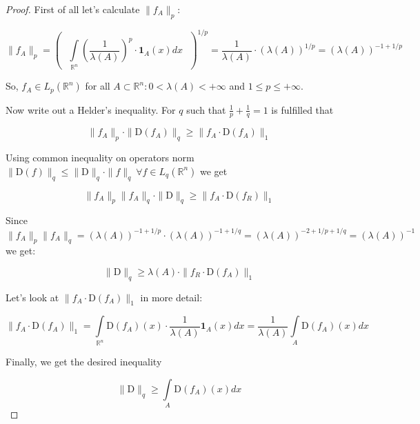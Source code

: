 \documentclass{article}
\begin{document}
    \begin{proof}
        First of all let's calculate $\|f_A\|_p$:

        \begin{equation*}
            \|f_A\|_p = \left( \text{ } \int\limits_{\mathbb{R}^n}\left(\dfrac{1}{\lambda(A)}\right)^p \cdot \textbf{1}_{A}(x) dx \text{ } \right)^{1/p} = \dfrac{1}{\lambda(A)} \cdot (\lambda(A))^{1/p} = (\lambda(A))^{-1 + 1/p}
        \end{equation*}

        So, $f_A \in L_p(\mathbb{R}^n)$ for all $A \subset \mathbb{R}^n : 0 < \lambda(A) < +\infty$ and $1 \leq p \leq +\infty$. 

        Now write out a Helder's inequality. For $q$ such that $\frac{1}{p} + \frac{1}{q} = 1$ is fulfilled that

        \begin{equation*}
            \|f_A\|_p \cdot \|\text{D}(f_A)\|_q \geq \|f_A \cdot \text{D}(f_A)\|_1
        \end{equation*}

        Using common inequality on operators norm $\|\text{D}(f)\|_q \leq \|\text{D}\|_q \cdot \|f\|_q ~\forall f \in L_q(\mathbb{R}^n)$ we get

        \begin{equation*}
            \|f_A\|_p \|f_A\|_q \cdot \|\text{D}\|_q \geq \|f_A \cdot \text{D}(f_R)\|_1
        \end{equation*}

        Since $\|f_A\|_p \|f_A\|_q = (\lambda(A))^{-1 + 1/p} \cdot (\lambda(A))^{-1 + 1/q} = (\lambda(A))^{-2 + 1/p + 1/q} = (\lambda(A))^{-1}$ we get:

        \begin{equation*}
            \|\text{D}\|_q \geq \lambda(A) \cdot \|f_R \cdot \text{D}(f_A)\|_1
        \end{equation*}

        Let's look at $\|f_A \cdot \text{D}(f_A)\|_1$ in more detail:

        \begin{equation*}
            \|f_A \cdot \text{D}(f_A)\|_1 = \int\limits_{\mathbb{R}^n} \text{D}(f_A)(x) \cdot \dfrac{1}{\lambda(A)} \textbf{1}_{A}(x) dx = \dfrac{1}{\lambda(A)} \int\limits_{A} \text{D}(f_A)(x)dx
        \end{equation*}

        Finally, we get the desired inequality

        \begin{equation*}
            \|\text{D}\|_q \geq \int\limits_{A} \text{D}(f_A)(x)dx
        \end{equation*}
    \end{proof}
        
\end{document}
